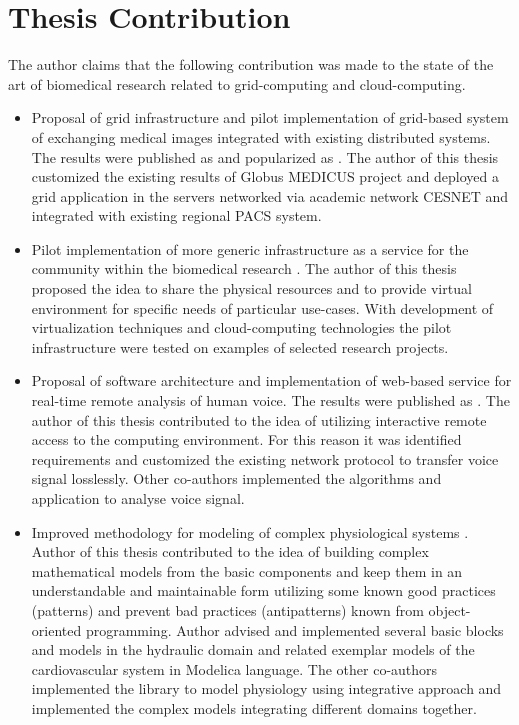 \section{Thesis Contribution}
The author claims that the following contribution was made to the state of the art of biomedical research related to grid-computing and cloud-computing.
\begin{itemize}
\item Proposal of grid infrastructure and pilot implementation of grid-based system of exchanging medical images integrated with existing distributed systems. The results were published as \cite{kulhanek2009} and popularized as \cite{Kulhanek2008Mefanet,Sarek2009,kulhanek2009dd}. The author of this thesis customized the existing results of Globus MEDICUS project and deployed a grid application in the servers networked via academic network CESNET and integrated with existing regional PACS system.
\item Pilot implementation of more generic infrastructure as a service for the community within the biomedical research \cite{kulhanek2010c, kulhanek2011dd}. The author of this thesis proposed the idea to share the physical resources and to provide virtual environment for specific needs of particular use-cases. With development of virtualization techniques and cloud-computing technologies the pilot infrastructure were tested on examples of selected research projects.
\item Proposal of software architecture and implementation of web-based service for real-time remote analysis of human voice. The results were published as \cite{kulhanek2010b, Kulhanek2010d, Kulhanek2012}. The author of this thesis contributed to the idea of utilizing interactive remote access to the computing environment. For this reason it was identified requirements and customized the existing network protocol to transfer voice signal losslessly. Other co-authors implemented the algorithms and application to analyse voice signal.
\item Improved methodology for modeling of complex physiological systems \cite{Kulhanek2014Modeling, Kulhanek2014mefanet, Matejak2014, kofranek2013hummod}. Author of this thesis contributed to the idea of building complex  mathematical models from the basic components and keep them in an understandable and maintainable form utilizing some known good practices (patterns) and prevent bad practices (antipatterns) known from object-oriented programming. Author advised and implemented several basic blocks and models in the hydraulic domain and related exemplar models of the cardiovascular system in Modelica language. The other co-authors implemented the library to model physiology using integrative approach and implemented the complex models integrating different domains together.

\end{itemize}
